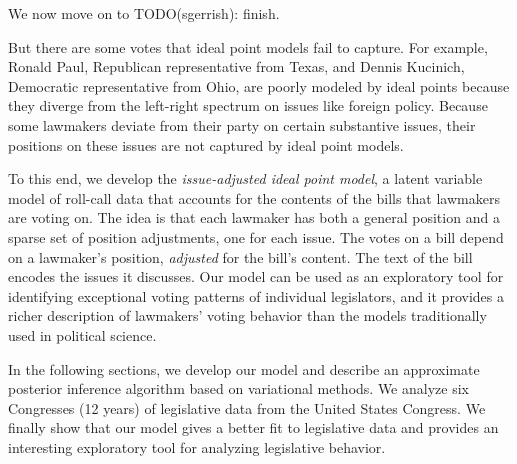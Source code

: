 We now move on to  TODO(sgerrish): finish.

But there are some votes that ideal point models fail to capture.  For
example, Ronald Paul, Republican representative from Texas, and Dennis
Kucinich, Democratic representative from Ohio, are poorly modeled by
ideal points because they diverge from the left-right spectrum on
issues like foreign policy. Because some lawmakers deviate from their
party on certain substantive issues, their positions on these issues
are not captured by ideal point models.

%



To this end, we develop the \emph{issue-adjusted ideal point model}, a
latent variable model of roll-call data that accounts for the contents
of the bills that lawmakers are voting on.  The idea is that each
lawmaker has both a general position and a sparse set of position
adjustments, one for each issue.  The votes on a bill depend on a
lawmaker's position, \emph{adjusted} for the bill's content.  The text
of the bill encodes the issues it discusses. Our model can be used as
an exploratory tool for identifying exceptional voting patterns of
individual legislators, and it provides a richer description of
lawmakers' voting behavior than the models traditionally used in
political science.


In the following sections, we develop our model and describe an
approximate posterior inference algorithm based on variational
methods.  We analyze six Congresses (12 years) of legislative data
from the United States Congress.  We finally show that our model gives
a better fit to legislative data and provides an interesting
exploratory tool for analyzing legislative behavior.

